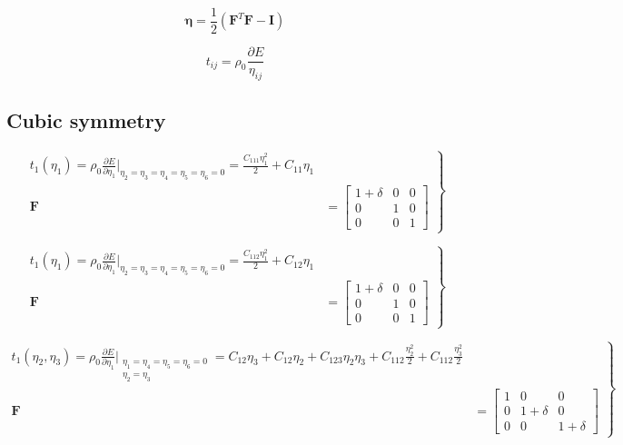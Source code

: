 \documentclass[showpacs,aps,floatfix,prb,reprint,superscriptaddress,onecolumn]{revtex4-1}
\begin{document}
\begin{equation}
\label{eqn:SM-GL1} 
\bm{\eta} = \frac{1}{2} \left(\bm{F}^{T} \bm{F} - \bm{I} \right)
\end{equation}

\begin{equation}
\label{eqn:SM-stressexpansion1} 
t_{ij} = \rho_{0} \frac{\partial E}{\eta_{ij}}
\end{equation}

\subsection{Cubic symmetry}


\begin{equation}
\label{eqn:SM-hexs1}
  \left.\begin{aligned}
        t_{1} \left(\eta_{1}\right) = \rho_{0} \frac{\partial E}{\partial \eta_{1}}\Bigr|_{\eta_2=\eta_3=\eta_4=\eta_5=\eta_6=0} = \frac{C_{111}\eta_{1}^2}{2} + C_{11}\eta_{1}\\
        \bm{F}&=\begin{bmatrix} 1+\delta & 0 & 0 \\ 0 & 1 & 0 \\ 0 & 0 & 1 \end{bmatrix}
       \end{aligned}
			\right\}
\end{equation}


\begin{equation}
\label{eqn:SM-hexs2}
  \left.\begin{aligned}
        t_{1} \left(\eta_{1}\right) = \rho_{0} \frac{\partial E}{\partial \eta_{1}}\Bigr|_{\eta_2=\eta_3=\eta_4=\eta_5=\eta_6=0} = \frac{C_{112}\eta_{1}^2}{2} + C_{12}\eta_{1}\\
        \bm{F}&=\begin{bmatrix} 1+\delta & 0 & 0 \\ 0 & 1 & 0 \\ 0 & 0 & 1 \end{bmatrix}
       \end{aligned}
			\right\}
\end{equation}

\begin{equation}
\label{eqn:SM-hexs3}
  \left.\begin{aligned}
        t_{1} \left(\eta_{2}, \eta_{3}\right) = \rho_{0} \frac{\partial E}{\partial \eta_{1}}\Bigr|_{\substack{\eta_1=\eta_4=\eta_5=\eta_6=0 \\ \eta_{2}=\eta_{3}}} = C_{12}\eta_{3} + C_{12}\eta_{2} + C_{123}\eta_{2}\eta_{3} + C_{112}\frac{\eta_{2}^{2}}{2} + C_{112}\frac{\eta_{3}^{2}}{2} \\
        \bm{F}&=\begin{bmatrix} 1 & 0 & 0 \\ 0 & 1+\delta & 0 \\ 0 & 0 & 1+\delta \end{bmatrix}
       \end{aligned}
			\right\}
\end{equation}
\end{document}
